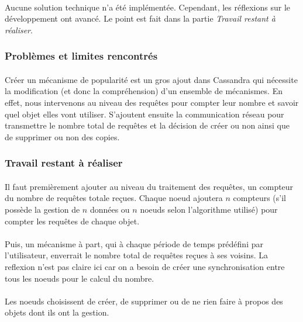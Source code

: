 \documentclass[12pt]{article}
\begin{document}
\paragraph{}Aucune solution technique n'a été implémentée. Cependant, les réflexions sur le développement ont avancé. Le point est fait dans la partie \textit{Travail restant à réaliser}.

\subsubsection*{Problèmes et limites rencontrés}

\paragraph{}Créer un mécanisme de popularité est un gros ajout dans Cassandra qui nécessite la modification (et donc la compréhension) d'un ensemble de mécanismes. En effet, nous intervenons au niveau des requêtes pour compter leur nombre et savoir quel objet elles vont utiliser. S'ajoutent ensuite la communication réseau pour transmettre le nombre total de requêtes et la décision de créer ou non ainsi que de supprimer ou non des copies.

\subsubsection*{Travail restant à réaliser}

\paragraph{}Il faut premièrement ajouter au niveau du traitement des requêtes, un compteur du nombre de requêtes totale reçues. Chaque noeud ajoutera $n$ compteurs (s'il possède la gestion de $n$ données ou $n$ noeuds selon l'algorithme utilisé) pour compter les requêtes de chaque objet.

\paragraph{}Puis, un mécanisme à part, qui à chaque période de temps prédéfini par l'utilisateur, enverrait le nombre total de requêtes reçues à ses voisins. La reflexion n'est pas claire ici car on a besoin de créer une synchronisation entre tous les noeuds pour le calcul du nombre.

\paragraph{}Les noeuds choisissent de créer, de supprimer ou de ne rien faire à propos des objets dont ils ont la gestion.
\end{document}

